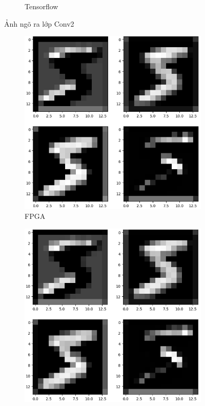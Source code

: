 \begin{figure}[H]
\begin{subfigure}[b]{0.45\linewidth}
        \caption{Tensorflow}
        \label{fig:enter-label}
        \end{subfigure}
    \caption{Ảnh ngõ ra lớp Conv2}
    \label{fig:main}
\end{figure}


\begin{figure}[H]
\centering
    \begin{subfigure}[b]{0.45\linewidth}
        \includegraphics[width=1\linewidth]{Images/fpgam1.png}
        \caption{FPGA}
        \label{fig:enter-label}
    \end{subfigure}
    \begin{subfigure}[b]{0.45\linewidth}
        \includegraphics[width=1\linewidth]{Images/cnnm1.png}

\end{subfigure}
\end{figure}
